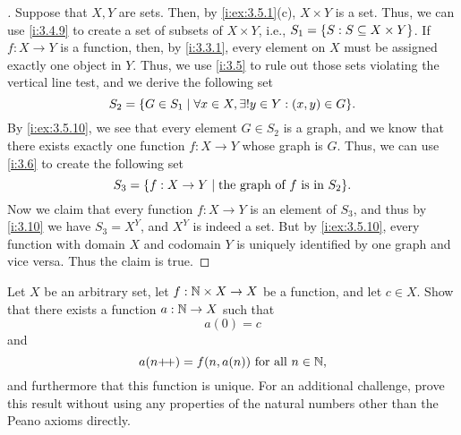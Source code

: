 \begin{proof}[]
  Suppose that \(X, Y\) are sets.
  Then, by \cref{i:ex:3.5.1}(c), \(X \times Y\) is a set.
  Thus, we can use \cref{i:3.4.9} to create a set of subsets of \(X \times Y\), i.e., \(S_1 = \left\lbrace S : S \subseteq X \times Y\right\rbrace\).
  If \(f : X \to Y\) is a function, then, by \cref{i:3.3.1}, every element on \(X\) must be assigned exactly one object in \(Y\).
  Thus, we use \cref{i:3.5} to rule out those sets violating the vertical line test, and we derive the following set
  \[
    S_2 = \set{G \in S_1 \mid \forall x \in X, \exists! y \in Y : (x, y) \in G}.
  \]
  By \cref{i:ex:3.5.10}, we see that every element \(G \in S_2\) is a graph, and we know that there exists exactly one function \(f : X \to Y\) whose graph is \(G\).
  Thus, we can use \cref{i:3.6} to create the following set
  \[
    S_3 = \set{f : X \to Y \mid \text{the graph of } f \text{ is in } S_2}.
  \]
  Now we claim that every function \(f : X \to Y\) is an element of \(S_3\), and thus by \cref{i:3.10} we have \(S_3 = X^Y\), and \(X^Y\) is indeed a set.
  But by \cref{i:ex:3.5.10}, every function with domain \(X\) and codomain \(Y\) is uniquely identified by one graph and vice versa.
  Thus the claim is true.
\end{proof}

\begin{ex}\label{i:ex:3.5.12}
  Let \(X\) be an arbitrary set, let \(f : \mathbb{N} \times X \to X\) be a function, and let \(c \in X\).
  Show that there exists a function \(a : \mathbb{N} \to X\) such that
  \[
    a(0) = c
  \]
  and
  \[
    a(n{+}\!{+}) = f(n, a(n)) \text{ for all } n \in \mathbb{N},
  \]
  and furthermore that this function is unique.
  For an additional challenge, prove this result without using any properties of the natural numbers other than the Peano axioms directly.
\end{ex}


